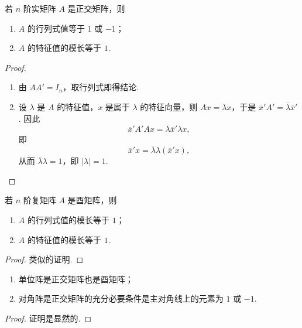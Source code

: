 \documentclass[../../main.tex]{subfiles}%
\begin{document}
\begin{theorem}\label{theorem:正交矩阵的行列式和特征值}
若 $n$ 阶实矩阵 $A$ 是正交矩阵，则
\begin{enumerate}[(1)]
\item $A$ 的行列式值等于 $1$ 或 $-1$；

\item $A$ 的特征值的模长等于 $1$.
\end{enumerate}
\end{theorem}
\begin{proof}
\begin{enumerate}[(1)]
\item 由 $AA' = I_n$，取行列式即得结论.

\item 设 $\lambda$ 是 $A$ 的特征值，$x$ 是属于 $\lambda$ 的特征向量，则 $Ax = \lambda x$，于是 $\overline{x}'A' = \overline{\lambda}\overline{x}'$. 因此
\[
\overline{x}'A'Ax = \overline{\lambda}\overline{x}'\lambda x,
\]
即
\[
\overline{x}'x = \overline{\lambda}\lambda(\overline{x}'x),
\]
从而 $\overline{\lambda}\lambda = 1$，即 $|\lambda| = 1$. 
\end{enumerate}
\end{proof}

\begin{theorem}\label{theorem:酉矩阵的行列式和特征值}
若 $n$ 阶复矩阵 $A$ 是酉矩阵，则
\begin{enumerate}
\item $A$ 的行列式值的模长等于 $1$；

\item $A$ 的特征值的模长等于 $1$.
\end{enumerate}
\end{theorem}
\begin{proof}
类似的证明.
\end{proof}

\begin{proposition}\label{proposition:常见的正交矩阵和酉矩阵}
\begin{enumerate}[(1)]
\item 单位阵是正交矩阵也是酉矩阵；

\item 对角阵是正交矩阵的充分必要条件是主对角线上的元素为 $1$ 或 $-1$. 
\end{enumerate}
\end{proposition}
\begin{proof}
证明是显然的.
\end{proof}
\end{document}
